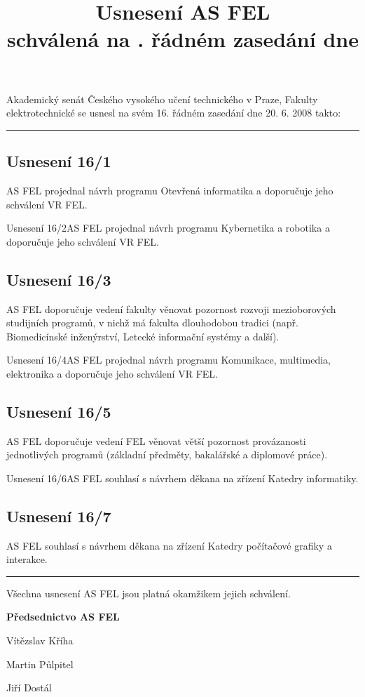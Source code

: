 \documentclass[a4paper,12pt,notitlepage]{article}
\title{Usnesení AS FEL\\schválená na \cislo. řádném zasedání dne \datum}
\author{}\date{}
\newcommand{\cislo}{16}
\newcommand{\datum}{20. 6. 2008 }
\newcommand{\hr}{\bigskip\hrule\bigskip}
\newcommand{\usneseni}[3]{
\subsection*{#1}

#2

}
\begin{document}
\maketitle
\thispagestyle{empty}


Akademický senát Českého vysokého učení technického v Praze, Fakulty
elektrotechnické se usnesl na svém \cislo. řádném zasedání dne \datum takto:\hr

\usneseni{Usnesení \cislo/1}{AS FEL projednal návrh programu Otevřená informatika a doporučuje jeho schválení VR FEL.}

\usneseni{Usnesení \cislo/2}{AS FEL projednal návrh programu Kybernetika a robotika a doporučuje jeho schválení VR FEL.}

\usneseni{Usnesení \cislo/3}{AS FEL doporučuje vedení fakulty věnovat pozornost rozvoji mezioborových studijních programů, v nichž má fakulta dlouhodobou tradici (např. Biomedicínské inženýrství, Letecké informační systémy a další).}

\usneseni{Usnesení \cislo/4}{AS FEL projednal návrh programu Komunikace, multimedia, elektronika a doporučuje jeho schválení VR FEL.}

\usneseni{Usnesení \cislo/5}{AS FEL doporučuje vedení FEL věnovat větší pozornost provázanosti jednotlivých programů (základní předměty, bakalářské a diplomové práce).}


\usneseni{Usnesení \cislo/6}{AS FEL souhlasí s návrhem děkana na zřízení Katedry informatiky.}

\usneseni{Usnesení \cislo/7}{AS FEL souhlasí s návrhem děkana na zřízení Katedry počítačové grafiky a interakce.}


\bigskip\hr
Všechna usnesení AS FEL jsou platná okamžikem jejich schválení.

\bigskip
\begin{center}
\textbf{Předsednictvo AS FEL}

Vítězslav Kříha

Martin Půlpitel

Jiří Dostál
\end{center}
\end{document}
